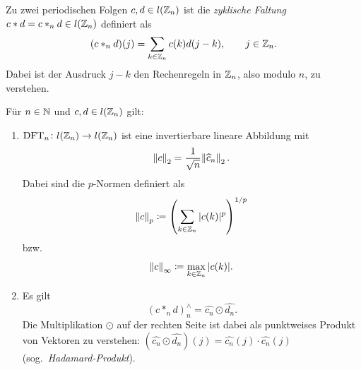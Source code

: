 \begin{definition}
Zu zwei periodischen Folgen $ c, d \in l(\mathbb{Z}_{n}) $ ist die \emph{zyklische Faltung}
$ c * d = c *_{n} d \in l(\mathbb{Z}_{n}) $ definiert als
\[
  (c *_{n} d)(j) = \sum_{k \in \mathbb{Z}_{n}} c(k) d(j - k), \qquad j \in \mathbb{Z}_{n}.
\]
Dabei ist der Ausdruck $ j - k $ den Rechenregeln in $ \mathbb{Z}_{n} $, also modulo $ n $, zu verstehen.
\end{definition}

\begin{proposition}
Für $ n \in \mathbb{N} $ und $ c, d \in l(\mathbb{Z}_{n}) $ gilt:
\begin{enumerate}
\item $ \operatorname{DFT}_{n} \colon l(\mathbb{Z}_{n}) \rightarrow l(\mathbb{Z}_{n}) $ ist eine invertierbare lineare Abbildung
  mit
  \[
    \norm{c}_{2} = \frac{1}{\sqrt{n}} \norm{\widehat{c}_{n}}_{2}.
  \]
  Dabei sind die $ p $-Normen definiert als
  \[
    \norm{c}_{p} \coloneqq \left( \sum_{k \in \mathbb{Z}_{n}} |c(k)|^{p} \right)^{1/p}
  \]
  bzw.
  \[
    \norm{c}_{\infty} \coloneqq \max_{k \in \mathbb{Z}_{n}} |c(k)|.
  \]
\item Es gilt
  \[
    (c *_{n} d)_{n}^{\wedge} = \widehat{c_{n}} \odot \widehat{d_{n}}.
  \]
  Die Multiplikation $ \odot $ auf der rechten Seite ist dabei als punktweises Produkt von Vektoren 
  zu verstehen: 
  $ \left( \widehat{c_{n}} \odot \widehat{d_{n}} \right)(j) = 
    \widehat{c_{n}}(j) \cdot \widehat{c_{n}}(j) $ (sog.\ \emph{Hadamard-Produkt}).
\end{enumerate}
\end{proposition}

